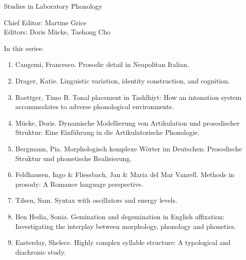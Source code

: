 
{\raggedleft{}}

\bigskip

{\large Studies in Laboratory Phonology}

\bigskip

Chief Editor:  Martine Grice%
\\
Editors:    Doris Mücke, %
    Taehong Cho %

\bigskip

In this series:

\begin{enumerate}
\item Cangemi, Francesco. Prosodic detail in Neapolitan Italian.
\item Drager, Katie. Linguistic variation, identity construction, and cognition.
\item Roettger, Timo B. Tonal placement in Tashlhiyt: How an intonation system accommodates to adverse phonological environments.
\item Mücke, Doris. Dynamische Modellierung von Artikulation und prosodischer Struktur: Eine Einführung in die Artikulatorische Phonologie.
\item Bergmann, Pia. Morphologisch komplexe Wörter im Deutschen: Prosodische Struktur und phonetische Realisierung. 
\item Feldhausen, Ingo \& Fliessbach, Jan \& Maria del Mar Vanrell. Methods in prosody: A Romance language perspective.
\item Tilsen, Sam. Syntax with oscillators and energy levels.
\item Ben Hedia, Sonia. Gemination and degemination in English affixation: Investigating the interplay between morphology, phonology and phonetics.
\item Easterday, Shelece. Highly complex syllable structure: A typological and diachronic study.
\end{enumerate}